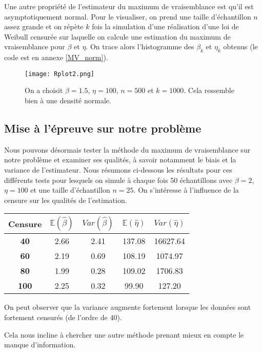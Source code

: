\documentclass[a4paper]{report}
\begin{document}
Une autre propriété de l'estimateur du maximum de vraisemblance est qu'il est asymptotiquement normal. Pour le visualiser, on prend une taille d'échantillon $n$ assez grande et on répète $k$ fois la simulation d'une réalisation d'une loi de Weibull censurée sur laquelle on calcule une estimation du maximum de vraisemblance pour $\beta$ et $\eta$. On trace alors l'histogramme des $\beta_k$ et $\eta_k$ obtenus (le code est en annexe \ref{MV_norm}). 

\begin{figure}[!ht]
	\centering
     	\texttt{[image: Rplot2.png]}

	\caption{On a choisit $\beta=1.5$, $\eta=100$, $n=500$ et $k=1000$. Cela ressemble bien à une densité normale.}
\end{figure}

\subsection{Mise à l'épreuve sur notre problème}

Nous pouvons désormais tester la méthode du maximum de vraisemblance sur notre problème et examiner ses qualités, à savoir notamment le biais et la variance de l'estimateur. Nous résumons ci-dessous les résultats pour ces différents tests pour lesquels on simule à chaque fois 50 échantillons avec $\beta=2$, $\eta=100$ et une taille d'échantillon $n=25$. On s'intéresse à l'influence de la censure sur les qualités de l'estimation.

\begin{center}
\begin{tabular}{|c||c|c||c|c|}
	\hline
	\bf Censure &  $\mathbb{E}(\hat{\beta})$  &  $Var(\hat{\beta})$ &  $\mathbb{E}(\hat{\eta})$ &  $Var(\hat{\eta})$ \\
	\hline
	\bf 40 &2.66 & 2.41 & 137.08 &16627.64 \\
	\hline
	\bf 60 &2.19 & 0.69 & 108.19 & 1074.97\\
	\hline
	\bf 80 &1.99 & 0.28 &109.02 &1706.83 \\
	\hline
	\bf 100 &2.25 &0.32  & 99.90&  127.20\\
	\hline
\end{tabular}
\end{center}

On peut observer que la variance augmente fortement lorsque les données sont fortement censurés (de l'ordre de 40).

Cela nous incline à chercher une autre méthode prenant mieux en compte le manque d'information. 
\end{document}
